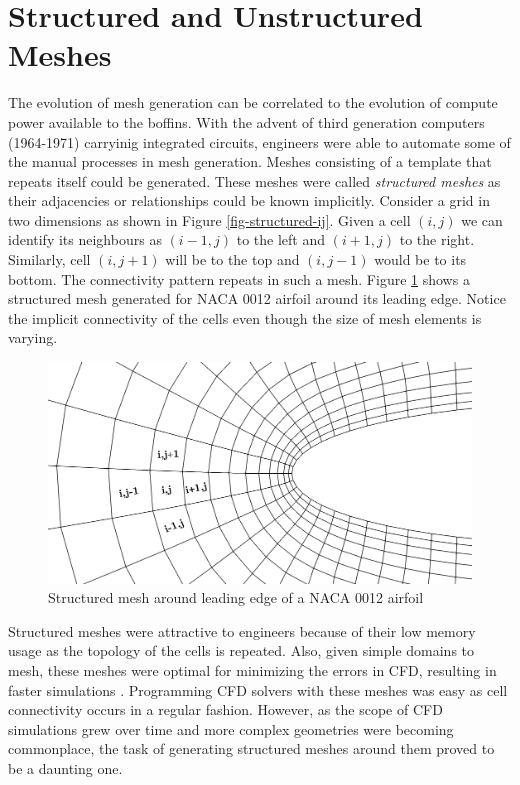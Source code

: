 \section{Structured and Unstructured Meshes}

The evolution of mesh generation can be correlated to the evolution of compute power available to the boffins. With the advent of third generation computers (1964-1971) carryinig integrated circuits, engineers were able to automate some of the manual processes in mesh generation. Meshes consisting of a template that repeats itself could be generated. These meshes were called \textit{structured meshes} as their adjacencies or relationships could be known implicitly. Consider a grid in two dimensions as shown in Figure \ref{fig-structured-ij}. Given a cell $(i,j)$ we can identify its neighbours as $(i-1, j)$ to the left and $(i+1, j)$ to the right. Similarly, cell $(i, j+1)$ will be to the top and $(i, j-1)$ would be to its bottom. The connectivity pattern repeats in such a mesh. Figure \ref{fig-structuredNaca0012} shows a structured mesh generated for NACA 0012 airfoil around its leading edge. Notice the implicit connectivity of the cells even though the size of mesh elements is varying.

\begin{figure}
  \centering
  \includegraphics[width=0.8\linewidth]{img/intro/stucturedNaca0012.png}
  \caption{Structured mesh around leading edge of a NACA 0012 airfoil}
  \label{fig-structuredNaca0012}
\end{figure}


Structured meshes were attractive to engineers because of their low memory usage as the topology of the cells is repeated. Also, given simple domains to mesh, these meshes were optimal for minimizing the errors in CFD, resulting in faster simulations \cite{d1991optimal}. Programming CFD solvers with these meshes was easy as cell connectivity occurs in a regular fashion. However, as the scope of CFD simulations grew over time and more complex geometries were becoming commonplace, the task of generating structured meshes around them proved to be a daunting one. 


